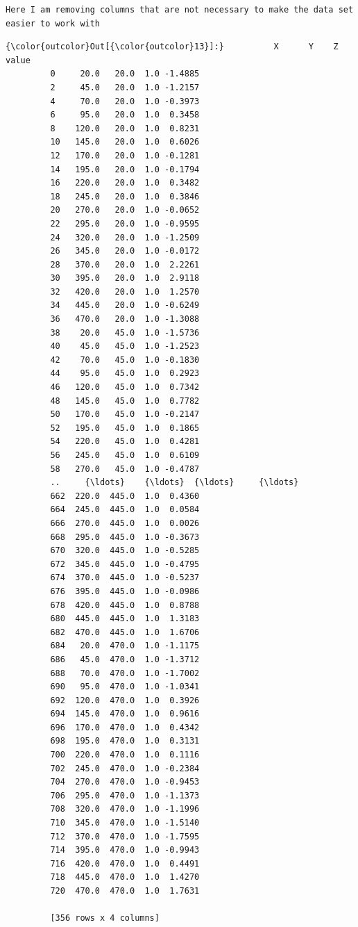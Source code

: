 \documentclass[11pt]{article}
\begin{document}
    \begin{Verbatim}[commandchars=\\\{\}]
Here I am removing columns that are not necessary to make the data set easier to work with

    \end{Verbatim}

\begin{Verbatim}[commandchars=\\\{\}]
{\color{outcolor}Out[{\color{outcolor}13}]:}          X      Y    Z   value
         0     20.0   20.0  1.0 -1.4885
         2     45.0   20.0  1.0 -1.2157
         4     70.0   20.0  1.0 -0.3973
         6     95.0   20.0  1.0  0.3458
         8    120.0   20.0  1.0  0.8231
         10   145.0   20.0  1.0  0.6026
         12   170.0   20.0  1.0 -0.1281
         14   195.0   20.0  1.0 -0.1794
         16   220.0   20.0  1.0  0.3482
         18   245.0   20.0  1.0  0.3846
         20   270.0   20.0  1.0 -0.0652
         22   295.0   20.0  1.0 -0.9595
         24   320.0   20.0  1.0 -1.2509
         26   345.0   20.0  1.0 -0.0172
         28   370.0   20.0  1.0  2.2261
         30   395.0   20.0  1.0  2.9118
         32   420.0   20.0  1.0  1.2570
         34   445.0   20.0  1.0 -0.6249
         36   470.0   20.0  1.0 -1.3088
         38    20.0   45.0  1.0 -1.5736
         40    45.0   45.0  1.0 -1.2523
         42    70.0   45.0  1.0 -0.1830
         44    95.0   45.0  1.0  0.2923
         46   120.0   45.0  1.0  0.7342
         48   145.0   45.0  1.0  0.7782
         50   170.0   45.0  1.0 -0.2147
         52   195.0   45.0  1.0  0.1865
         54   220.0   45.0  1.0  0.4281
         56   245.0   45.0  1.0  0.6109
         58   270.0   45.0  1.0 -0.4787
         ..     {\ldots}    {\ldots}  {\ldots}     {\ldots}
         662  220.0  445.0  1.0  0.4360
         664  245.0  445.0  1.0  0.0584
         666  270.0  445.0  1.0  0.0026
         668  295.0  445.0  1.0 -0.3673
         670  320.0  445.0  1.0 -0.5285
         672  345.0  445.0  1.0 -0.4795
         674  370.0  445.0  1.0 -0.5237
         676  395.0  445.0  1.0 -0.0986
         678  420.0  445.0  1.0  0.8788
         680  445.0  445.0  1.0  1.3183
         682  470.0  445.0  1.0  1.6706
         684   20.0  470.0  1.0 -1.1175
         686   45.0  470.0  1.0 -1.3712
         688   70.0  470.0  1.0 -1.7002
         690   95.0  470.0  1.0 -1.0341
         692  120.0  470.0  1.0  0.3926
         694  145.0  470.0  1.0  0.9616
         696  170.0  470.0  1.0  0.4342
         698  195.0  470.0  1.0  0.3131
         700  220.0  470.0  1.0  0.1116
         702  245.0  470.0  1.0 -0.2384
         704  270.0  470.0  1.0 -0.9453
         706  295.0  470.0  1.0 -1.1373
         708  320.0  470.0  1.0 -1.1996
         710  345.0  470.0  1.0 -1.5140
         712  370.0  470.0  1.0 -1.7595
         714  395.0  470.0  1.0 -0.9943
         716  420.0  470.0  1.0  0.4491
         718  445.0  470.0  1.0  1.4270
         720  470.0  470.0  1.0  1.7631
         
         [356 rows x 4 columns]
\end{Verbatim}
            
\end{document}
